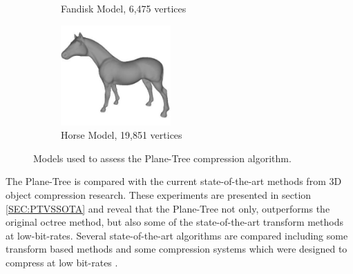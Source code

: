 \begin{figure}[t]
\begin{center}
\begin{subfigure}[b]{4.4cm}
                \captionsetup{justification=centering}
                \caption{Fandisk Model, 6,475 vertices}
                \label{fig:MODELSUSEDA_FANDISK}
        \end{subfigure}%
        \begin{subfigure}[b]{4.4cm}
                \includegraphics[width=4.2cm]{images/experiments/test_data/models_used/horse_19851}
                \captionsetup{justification=centering}
                \caption{Horse Model, 19,851 vertices}
                \label{fig:MODELSUSEDA_HORSE}
        \end{subfigure}
       \caption{Models used to assess the Plane-Tree compression algorithm.}
       \label{fig:MODELSUSEDA}
       \end{center}
\end{figure}



The Plane-Tree is compared with the current state-of-the-art methods from 3D object compression research. These experiments are presented in section \ref{SEC:PTVSSOTA} and reveal that the Plane-Tree not only, outperforms the original octree method, but also some of the state-of-the-art transform methods at low-bit-rates. Several state-of-the-art algorithms are compared including some transform based methods \cite{Bayazit103DMesh,Khodakovsky00Progressive} and some compression systems which were designed to compress at low bit-rates \cite{Peng10Feature,Lincoln13Hons}. \\ 

